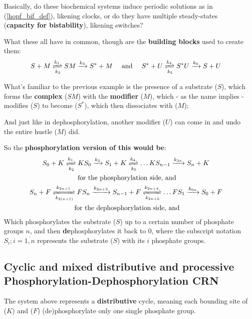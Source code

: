Basically, do these biochemical systems induce periodic solutions as in (\ref{hopf_bif_def}), likening clocks, or do they have multiple steady-states (\textbf{capacity for bistability}), likening switches?

What these all have in common, though are the \textbf{building blocks} used to create them:
\begin{equation}\label{ptm_building_blocks}
	S+M \xrightleftharpoons[k_2]{k_1} SM \xrightarrow{k_3} S^* + M \quad \mathrm{~and~} \quad S^* + U \xrightleftharpoons[k_5]{k_4} S^* U \xrightarrow{k_6} S + U
\end{equation}

What's familiar to the previous example is the presence of a substrate ($S$), which forms the \textbf{complex} ($SM$) with the \textbf{modifier} ($M$), which - as the name implies - modifies ($S$) to become ($S^*$), which then dissociates with ($M$);

And just like in dephosphorylation, another modifier ($U$) can come in and undo the entire hustle ($M$) did.

So the \textbf{phosphorylation version of this would be}:
\begin{gather*}\label{phosphorylation_reaction_basis}
	S_0 + K \xrightleftharpoons[k_2]{k_1} K S_0 \xrightarrow{k_3} S_1 + K  \xrightleftharpoons[k_5]{k_4} \ldots K S_{n-1} \xrightarrow{k_{ 3n}} S_n + K  \\
	\text{ for the phosphorylation side, and} \\
	S_n + F \xrightleftharpoons[k_{2(n+1)}]{k_{2n+1}} F S_n \xrightarrow{k_{2n + 3}} S_{n-1} + F  \xrightleftharpoons[k_{2n + 5}]{k_{2n + 4}} \ldots F S_{1} \xrightarrow{k_{6n}} S_0 + F  \\
	\text{ for the dephosphorylation side, and}
\end{gather*}
Which phosphorylates the substrate ($S$) up to a certain number of phosphate groups $n$, and then \textbf{de}phosphorylates it back to 0, where the subscript notation $S_i ;  i = \overline{1,n}$ represents the substrate ($S$) with its $i$ phosphate groups.

\subsection{Cyclic and mixed distributive and processive Phosphorylation-Dephosphorylation CRN}
The system above represents a \textbf{distributive} cycle, meaning each bounding site of ($K$) and ($F$) (de)phosphorylate only one single phosphate group.


